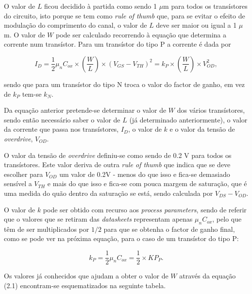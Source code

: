\documentclass[11pt]{article}
\numberwithin{equation}{section}
\begin{document}
O valor de $L$ ficou decidido à partida como sendo 1 $\mu$m para todos os transístores do circuito, isto porque se tem como \textit{rule of thumb} que, para se evitar o efeito de modulação do comprimento do canal, o valor de $L$ deve ser maior ou igual a 1 $\mu$m. O valor de $W$ pode ser calculado recorrendo à equação que determina a corrente num transístor. Para um transístor do tipo P a corrente é dada por

\vspace{-3mm}
\begin{equation}
I_{D} = \frac{1}{2}\mu_{n}C_{ox}\times \left(\frac{W}{L}\right) \times \left(V_{GS}-V_{TH}\right)^2 = k_P \times \left(\frac{W}{L}\right) \times V_{OD}^2,
\label{eq:corrente}
\end{equation}

\vspace{1mm}
sendo que para um transístor do tipo N troca o valor do factor de ganho, em vez de $k_P$ tem-se $k_N$.

Da equação anterior pretende-se determinar o valor de $W$ dos vários transístores, sendo então necessário saber o valor de $L$ (já determinado anteriormente), o valor da corrente que passa nos transístores, $I_{D}$, o valor de $k$ e o valor da tensão de \textit{overdrive}, $V_{OD}$.

O valor da tensão de \textit{overdrive} definiu-se como sendo de 0.2 V para todos os transístores. Este valor deriva de outra \textit{rule of thumb} que indica que se deve escolher para $V_{OD}$ um valor de 0.2V - menos do que isso e fica-se demasiado sensível a $V_{TH}$ e mais do que isso e fica-se com pouca margem de saturação, que é uma medida do quão dentro da saturação se está, sendo calculada por $V_{DS} - V_{OD}$.

O valor de $k$ pode ser obtido com recurso aos \textit{process parameters}, sendo de referir que o valores que se retiram das \textit{datasheets} representam apenas $\mu_{n}C_{ox}$, pelo que têm de ser multiplicados por $1/2$ para que se obtenha o factor de ganho final, como se pode ver na próxima equação, para o caso de um transístor do tipo P:

\vspace{-3mm}
\begin{equation}
k_P = \frac{1}{2}\mu_{n}C_{ox} = \frac{1}{2} \times KP_P.
\end{equation}

\vspace{1mm}
Os valores já conhecidos que ajudam a obter o valor de $W$ através da equação (2.1) encontram-se esquematizados na seguinte tabela.
\end{document}
